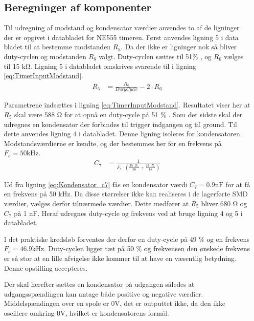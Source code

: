 \subsection{Beregninger af komponenter}
Til udregning af modstand og kondensator værdier anvendes to af de ligninger der er opgivet i databladet for NE555 timeren. 
Først anvendes ligning 5 i data bladet til at bestemme modstanden $R_5$. 
Da der ikke er ligninger nok så bliver duty-cyclen og modstanden $R_6$ valgt. 
Duty-cyclen sættes til 51\%  , og $R_6$ vælges til 15 \si{\kilo\ohm}. 
Ligning 5 i databladet omskrives svarende til i ligning \ref{eq:TimerInputModstand}.
\begin{align}
R_5 & = \frac{R_6}{DutyCycle} - 2 \cdot R_6 \label{eq:TimerInputModstand}
\end{align}

Parametrene indsættes i ligning \ref{eq:TimerInputModstand}.
Resultatet viser her at $R_5$ skal være 588 \si{\ohm}  for at opnå en duty-cycle på 51 \% .
Som det sidste skal der udregnes en kondensator der forbindes til trigger indgangen og til ground. 
Til dette anvendes ligning 4 i databladet. Denne ligning isoleres for kondensatoren.
Modstandsværdierne er kendte, og der bestemmes her for en frekvens på $F_c = 50 \si{\kilo\hertz}$.
\begin{align}
	C_7 & = \frac{1}{F_c \cdot \left( \frac{25 \cdot R_5 }{36} + \frac{25 \cdot R_6}{18} \right) \label{eq:Kondensator_c7}}
\end{align}

Ud fra ligning \ref{eq:Kondensator_c7} fås en kondensator værdi $C_7 = 0.9\si{\nano\farad}$ for at få en frekvens på 50 \si{\kilo\hertz}. 
Da disse størrelser ikke kan realiseres i de lagerførte SMD værdier, vælges derfor tilnærmede værdier. 
Dette medfører at $R_5$ bliver 680 \si{\ohm} og $C_7$ på 1 \si{\nano\farad}. 
Heraf udregnes duty-cycle og frekvens ved at bruge ligning 4 og 5 i databladet.

I det praktiske kredsløb forventes der derfor en duty-cycle på 49 \% og en frekvens $F_c = 46.9 \si{\kilo\hertz}$. 
Duty-cyclen ligger tæt på 50 \% og frekvensen den ønskede frekvens er så stor at en lille afvigelse ikke kommer til at have en væsentlig betydning. Denne opstilling accepteres.

Der skal herefter sættes en kondensator på udgangen således at udgangsspændingen kan antage både positive og negative værdier. 
Middelspændingen over en spole er $0 \si{\volt}$, det er outputtet ikke, da den ikke oscillere omkring $0 \si{\volt}$, hvilket er kondensatorens formål. 
